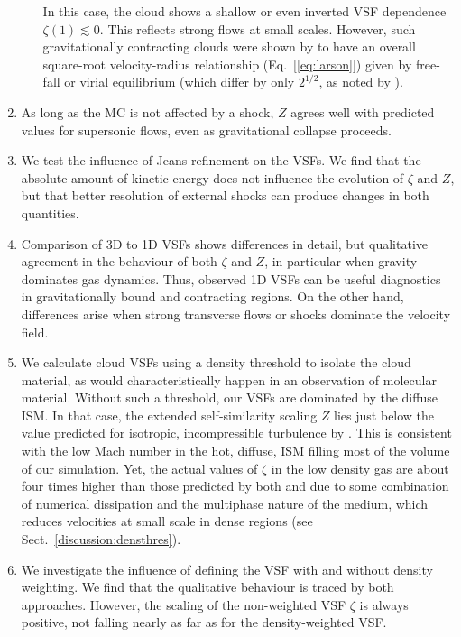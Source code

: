 \begin{enumerate}
\begin{itemize}
        In this case, the cloud shows a shallow or even inverted VSF dependence $\zeta(1) \lesssim 0$. 
        This reflects strong flows at small scales. However, such gravitationally contracting clouds were shown by  to have an overall square-root velocity-radius relationship (Eq.~[\ref{eq:larson}]) given by free-fall or virial equilibrium (which differ by only $2^{1/2}$, as noted by \citealt{Ballesteros2011}).
    \end{itemize}
	\item As long as the MC is not affected by a shock, $Z$ agrees well with predicted values for supersonic flows, even as gravitational collapse proceeds.
	\item We test the influence of Jeans refinement on the VSFs. We find that the absolute amount of kinetic energy does not influence the evolution of $\zeta$ and $Z$, but that better resolution of external shocks can produce changes in both quantities.
	\item Comparison of 3D to 1D VSFs shows differences in detail, but qualitative agreement in the behaviour of both $\zeta$ and $Z$, in particular when gravity dominates gas dynamics. 
	Thus, observed 1D VSFs can be useful diagnostics in gravitationally bound and contracting regions. 
	On the other hand, differences arise when strong transverse flows or shocks dominate the velocity field. 
	\item We calculate cloud VSFs using a density threshold to isolate the cloud material, as would characteristically happen in an observation of molecular material. 
	Without such a threshold, our VSFs are dominated by the diffuse ISM. In that case, the extended self-similarity scaling $Z$ lies just below the value predicted for isotropic, incompressible turbulence by \citet{She1994}. 
	This is consistent with the low Mach number in the hot, diffuse, ISM filling most of the volume of our simulation.
    Yet, the actual values of $\zeta$ in the low density gas are about four times higher than those predicted by both \citet{She1994} and \citet{Boldyrev2002} due to some combination of numerical dissipation and the multiphase nature of the medium, which reduces velocities at small scale in dense regions (see Sect.\ \ref{discussion:densthres}).
	\item We investigate the influence of defining the VSF with and without density weighting. 
	We find that the qualitative behaviour is traced by both approaches. 
	However, the scaling of the non-weighted VSF $\zeta$ is always positive, not falling nearly as far as for the density-weighted VSF. 

\end{enumerate}
